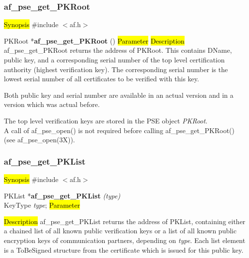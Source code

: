 \subsubsection{af\_pse\_get\_PKRoot}
\label{af_get_PKRoot}
\hl{Synopsis}
\#include $<$af.h$>$

PKRoot *{\bf af\_pse\_get\_PKRoot} ()
\hl{Parameter}
\hl{Description}
af\_pse\_get\_PKRoot returns the address of PKRoot. This contains DName, public key, and a corresponding
serial number of the top level certification authority (highest verification key).
The corresponding serial number is the lowest serial number of all certificates to be 
verified with this key.

Both public key and serial number are available in an actual version and in a version which was
actual before.

The top level verification keys are stored in the PSE object
{\em PKRoot}.
\\ [1em]
A call of af\_pse\_open() is not required before calling af\_pse\_get\_PKRoot()
(see af\_pse\_open(3X)).


\subsubsection{af\_pse\_get\_PKList}
\label{af_get_PKList}
\hl{Synopsis}
\#include $<$af.h$>$

PKList *{\bf af\_pse\_get\_PKList} {\em (type)} \\
KeyType {\em type};
\hl{Parameter}

\hl{Description}
af\_pse\_get\_PKList returns the address of PKList, containing either a chained list of all known
public verification keys or a list of all known public encryption keys of communication partners,
depending on {\em type}.
Each list element is a ToBeSigned structure from the certificate which is issued for this public key.
 
